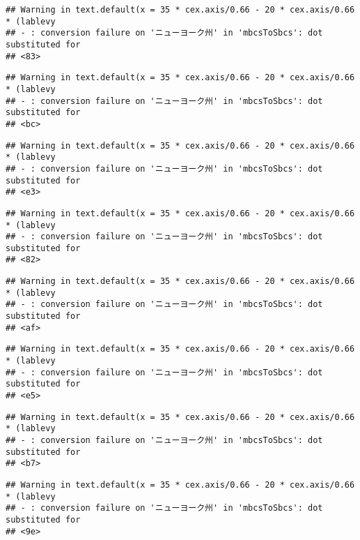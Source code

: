 \documentclass[
]{article}
\begin{document}
\begin{verbatim}
## Warning in text.default(x = 35 * cex.axis/0.66 - 20 * cex.axis/0.66 * (lablevy
## - : conversion failure on 'ニューヨーク州' in 'mbcsToSbcs': dot substituted for
## <83>
\end{verbatim}

\begin{verbatim}
## Warning in text.default(x = 35 * cex.axis/0.66 - 20 * cex.axis/0.66 * (lablevy
## - : conversion failure on 'ニューヨーク州' in 'mbcsToSbcs': dot substituted for
## <bc>
\end{verbatim}

\begin{verbatim}
## Warning in text.default(x = 35 * cex.axis/0.66 - 20 * cex.axis/0.66 * (lablevy
## - : conversion failure on 'ニューヨーク州' in 'mbcsToSbcs': dot substituted for
## <e3>
\end{verbatim}

\begin{verbatim}
## Warning in text.default(x = 35 * cex.axis/0.66 - 20 * cex.axis/0.66 * (lablevy
## - : conversion failure on 'ニューヨーク州' in 'mbcsToSbcs': dot substituted for
## <82>
\end{verbatim}

\begin{verbatim}
## Warning in text.default(x = 35 * cex.axis/0.66 - 20 * cex.axis/0.66 * (lablevy
## - : conversion failure on 'ニューヨーク州' in 'mbcsToSbcs': dot substituted for
## <af>
\end{verbatim}

\begin{verbatim}
## Warning in text.default(x = 35 * cex.axis/0.66 - 20 * cex.axis/0.66 * (lablevy
## - : conversion failure on 'ニューヨーク州' in 'mbcsToSbcs': dot substituted for
## <e5>
\end{verbatim}

\begin{verbatim}
## Warning in text.default(x = 35 * cex.axis/0.66 - 20 * cex.axis/0.66 * (lablevy
## - : conversion failure on 'ニューヨーク州' in 'mbcsToSbcs': dot substituted for
## <b7>
\end{verbatim}

\begin{verbatim}
## Warning in text.default(x = 35 * cex.axis/0.66 - 20 * cex.axis/0.66 * (lablevy
## - : conversion failure on 'ニューヨーク州' in 'mbcsToSbcs': dot substituted for
## <9e>
\end{verbatim}
\end{document}
